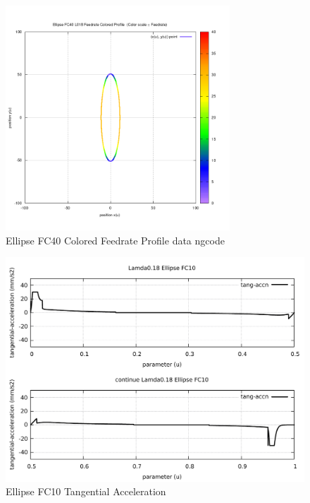 \begin{figure}
	\caption     {Ellipse FC40 Colored Feedrate Profile data ngcode}
	\label{20-img-Ellipse-FC40-Colored-Feedrate-Profile-data_ngcode.png}
	\includegraphics[width=0.75\textwidth]{Chap4/appendix/app-Ellipse/plots/20-img-Ellipse-FC40-Colored-Feedrate-Profile-data_ngcode.png}
\end{figure}

\clearpage
\pagebreak

\begin{figure}
	\caption     {Ellipse FC10 Tangential Acceleration}
	\label{21-img-Ellipse-FC10-Tangential-Acceleration.pdf}
	\includegraphics[width=1.00\textwidth]{Chap4/appendix/app-Ellipse/plots/21-img-Ellipse-FC10-Tangential-Acceleration.pdf}
\end{figure}


